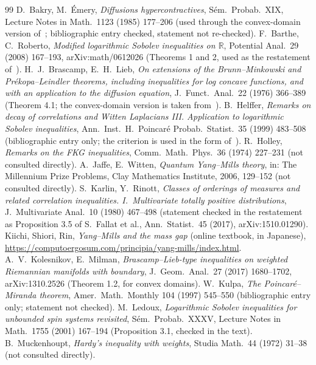 \documentclass[11pt,a4paper]{article}
\theoremstyle{definition}
\theoremstyle{remark}
\begin{document}
\begin{thebibliography}{99}
 D.~Bakry, M.~Émery, \emph{Diffusions hypercontractives}, Sém.\ Probab.\ XIX, Lecture Notes in Math.\ 1123 (1985) 177--206 (used through the convex-domain version of~\cite{KM}; bibliographic entry checked, statement not re-checked).
 F.~Barthe, C.~Roberto, \emph{Modified logarithmic Sobolev inequalities on $\mathbb R$}, Potential Anal.\ 29 (2008) 167--193, arXiv:math/0612026 (Theorems 1 and 2, used as the restatement of~\cite{Mu}).
 H.~J.~Brascamp, E.~H.~Lieb, \emph{On extensions of the Brunn--Minkowski and Prékopa--Leindler theorems, including inequalities for log concave functions, and with an application to the diffusion equation}, J.\ Funct.\ Anal.\ 22 (1976) 366--389 (Theorem 4.1; the convex-domain version is taken from~\cite{KM}).
 B.~Helffer, \emph{Remarks on decay of correlations and Witten Laplacians III. Application to logarithmic Sobolev inequalities}, Ann.\ Inst.\ H.~Poincaré Probab.\ Statist.\ 35 (1999) 483--508 (bibliographic entry only; the criterion is used in the form of~\cite{Le}).
 R.~Holley, \emph{Remarks on the FKG inequalities}, Comm.\ Math.\ Phys.\ 36 (1974) 227--231 (not consulted directly).
 A.~Jaffe, E.~Witten, \emph{Quantum Yang--Mills theory}, in: The Millennium Prize Problems, Clay Mathematics Institute, 2006, 129--152 (not consulted directly).
 S.~Karlin, Y.~Rinott, \emph{Classes of orderings of measures and related correlation inequalities. I.~Multivariate totally positive distributions}, J.\ Multivariate Anal.\ 10 (1980) 467--498 (statement checked in the restatement as Proposition 3.5 of S.~Fallat et al., Ann.\ Statist.\ 45 (2017), arXiv:1510.01290).
 Kiichi, Shiori, Rin, \emph{Yang--Mills and the mass gap} (online textbook, in Japanese), \url{https://computoergosum.com/principia/yang-mills/index.html}.
 A.~V.~Kolesnikov, E.~Milman, \emph{Brascamp--Lieb-type inequalities on weighted Riemannian manifolds with boundary}, J.\ Geom.\ Anal.\ 27 (2017) 1680--1702, arXiv:1310.2526 (Theorem 1.2, for convex domains).
 W.~Kulpa, \emph{The Poincaré--Miranda theorem}, Amer.\ Math.\ Monthly 104 (1997) 545--550 (bibliographic entry only; statement not checked).
 M.~Ledoux, \emph{Logarithmic Sobolev inequalities for unbounded spin systems revisited}, Sém.\ Probab.\ XXXV, Lecture Notes in Math.\ 1755 (2001) 167--194 (Proposition 3.1, checked in the text).
 B.~Muckenhoupt, \emph{Hardy's inequality with weights}, Studia Math.\ 44 (1972) 31--38 (not consulted directly).
\end{thebibliography}
\end{document}
